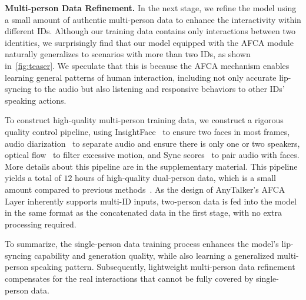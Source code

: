 %
\noindent \textbf{Multi-person Data Refinement.}
In the next stage, we refine the model using a small amount of authentic multi-person data to enhance the interactivity within different IDs.
Although our training data contains only interactions between two identities, we surprisingly find that our model equipped with the AFCA module naturally generalizes to scenarios with more than two IDs, as shown in~\cref{fig:teaser}.
We speculate that this is because the AFCA mechanism enables learning general patterns of human interaction, including not only accurate lip-syncing to the audio but also listening and responsive behaviors to other IDs' speaking actions.

To construct high-quality multi-person training data, we construct a rigorous quality control pipeline, using InsightFace~\cite{deng2019arcface} to ensure two faces in most frames, audio diarization~\cite{Plaquet23} to separate audio and ensure there is only one or two speakers, optical flow~\cite{karaev2024cotracker} to filter excessive motion, and Sync scores~\cite{chung2016out} to pair audio with faces. 
More details about this pipeline are in the supplementary material.
This pipeline yields a total of $12$ hours of high-quality dual-person data, which is a small amount compared to previous methods~\cite{kong2025let, wang2025interacthuman, ma2025playmate2}. 
As the design of AnyTalker's AFCA Layer inherently supports multi-ID inputs, two-person data is fed into the model in the same format as the concatenated data in the first stage, with no extra processing required.

To summarize, the single-person data training process enhances the model's lip-syncing capability and generation quality, while also learning a generalized multi-person speaking pattern. Subsequently, lightweight multi-person data refinement compensates for the real interactions that cannot be fully covered by single-person data.




